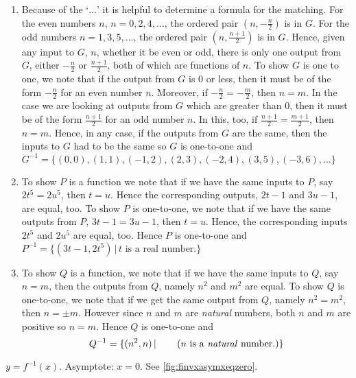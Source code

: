 \begin{exenum}
\begin{enumerate}
\item  Because of the `$\ldots$' it is helpful to determine a formula for the matching. For the even numbers $n$, $n = 0, 2, 4, \ldots$, the ordered pair $\left(n, -\frac{n}{2} \right)$ is in $G$.  For the odd numbers  $n = 1, 3, 5, \ldots$, the ordered pair $\left(n, \frac{n+1}{2} \right)$ is in $G$.  Hence, given any input to $G$, $n$, whether it be even or odd, there is only one output from $G$, either $-\frac{n}{2}$ or $\frac{n+1}{2}$, both of which are functions of $n$. To show $G$ is one to one, we note that if the output from $G$ is $0$ or less, then it must be of the form $-\frac{n}{2}$ for an even number $n$.  Moreover, if $-\frac{n}{2} = -\frac{m}{2}$, then $n = m$. In the case we are looking at outputs from $G$ which are greater than $0$, then it must be of the form $\frac{n+1}{2}$ for an odd number $n$.  In this, too, if  $\frac{n+1}{2} = \frac{m+1}{2}$, then $n = m$.  Hence, in any case, if the outputs from $G$ are the same, then the inputs to $G$ had to be the same so  $G$ is one-to-one and $G^{-1} = \{ (0,0), (1,1), (-1,2), (2,3), (-2,4), (3,5), \allowbreak (-3,6), \ldots \}$  


\item  To show $P$ is a function we note that if we have the same inputs to $P$, say $2t^{5} = 2u^{5}$, then $t = u$.  Hence the corresponding outputs, $2t-1$ and $3u-1$, are equal, too. To show $P$ is one-to-one, we note that if we have the same outputs from $P$, $3t-1 = 3u-1$, then $t = u$.  Hence, the corresponding  inputs $2t^5$  and $2u^5$ are equal, too. Hence $P$ is one-to-one and $P^{-1} = \{ (3t-1, 2t^5) \, | \, \text{$t$ is a real number.} \}$

\item  To show $Q$ is a function, we note that if we have the same inputs to $Q$, say $n = m$, then the outputs from $Q$, namely $n^2$ and $m^2$ are equal. To show $Q$ is one-to-one, we note that if we get the same output from $Q$, namely $n^2 = m^2$, then $n = \pm m$.  However since $n$ and $m$ are \textit{natural} numbers, both $n$ and $m$ are positive so $n = m$. Hence $Q$ is one-to-one and
\[Q^{-1} = \{ (n^2, n) \, | \, \tag{$n$ is a \textit{natural} number.} \}\]

\end{enumerate}

\item $y = f^{-1}(x)$. Asymptote: $x = 0$. See \autoref{fig:finvxasymxeqzero}.

\begin{mfigure}
    

\end{mfigure}
\end{exenum}
